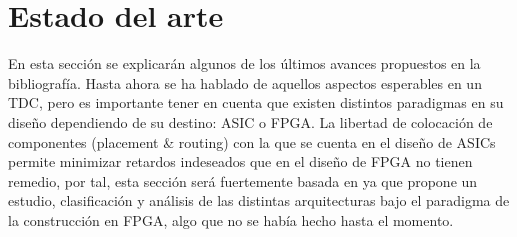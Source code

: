 \clearpage





\section{Estado del arte}
En esta sección se explicarán algunos de los últimos avances propuestos en la bibliografía. Hasta ahora se ha hablado de
aquellos aspectos esperables en un TDC, pero es importante tener en cuenta que existen distintos paradigmas en su diseño dependiendo
de su destino: ASIC o FPGA. La libertad de colocación de componentes (placement \& routing) con 
la que se cuenta en el diseño de ASICs permite minimizar retardos indeseados que en el diseño de FPGA no tienen remedio, por tal,
esta sección será fuertemente basada en \cite{Machado} ya que propone un estudio, clasificación y análisis de las distintas 
arquitecturas bajo el paradigma de la construcción en FPGA, algo que no se había hecho hasta el momento.\\


